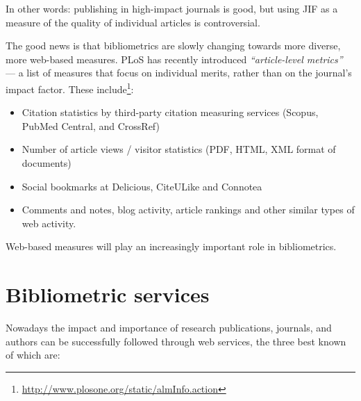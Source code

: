 \documentclass[graybox,envcountchap,sectrefs,UStrade]{svmono}
\begin{document}
In other words: publishing in high-impact journals is good, but using JIF as a measure of the quality of individual articles is controversial. \par

The good news is that bibliometrics are slowly changing towards more diverse, more web-based measures. PLoS has recently introduced \emph{``article-level metrics''} --- a list of measures that focus on individual merits, rather than on the journal's impact factor. These include\footnote{\url{http://www.plosone.org/static/almInfo.action}}:

\begin{itemize}\renewcommand{\labelenumi}{(\textit{\alph{enumi}})}
  \item Citation statistics by third-party citation measuring services (Scopus, PubMed Central, and CrossRef)
  \item Number of article views / visitor statistics (PDF, HTML, XML format of documents)
  \item Social bookmarks at Delicious, CiteULike and Connotea
  \item Comments and notes, blog activity, article rankings and other similar types of web activity.
\end{itemize}

Web-based measures will play an increasingly important role in bibliometrics.\par


\section{Bibliometric services}

Nowadays the impact and importance of research publications, journals, and authors can be successfully followed through web services, the three best known of which are:
\end{document}
